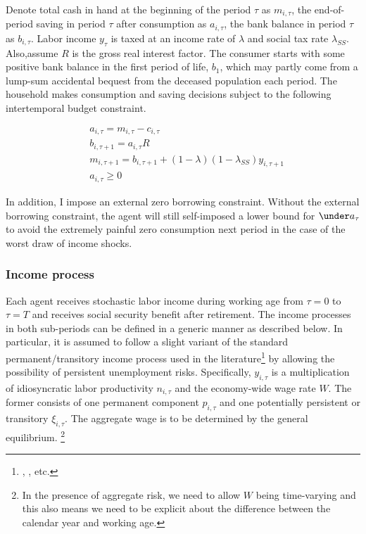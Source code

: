  Denote total cash in hand at the beginning of the period
\(\tau\) as $m_{i,\tau}$, the end-of-period saving in period $\tau$ after consumption as $a_{i,\tau}$, the bank balance in period $\tau$ as $b_{i,\tau}$. Labor income $y_\tau$ is taxed at an income rate of $\lambda$ and social tax rate $\lambda_{SS}$. Also,assume 
$R$ is the gross real interest factor. The consumer starts with some positive bank balance in the first period of life,  $b_1$, which may partly come from a lump-sum accidental bequest from the deceased population each period. The household makes consumption and saving decisions subject to the following intertemporal budget constraint.

\begin{equation}
\begin{split}
& a_{i,\tau} = m_{i,\tau} - c_{i,\tau} \\
& b_{i,\tau+1} = a_{i,\tau} R  \\
& m_{i,\tau+1}   = b_{i,\tau+1}+(1-\lambda)(1-\lambda_{SS})y_{i,\tau+1}\\
& a_{i,\tau} \geq 0 
\end{split}
\end{equation}

In addition, I impose an external zero borrowing constraint.  Without the external borrowing constraint, the agent will still self-imposed a lower bound for $\under a_\tau$ to avoid the extremely painful zero consumption next period in the case of the worst draw of income shocks. 



\subsubsection{Income process}

Each agent receives stochastic labor income during working age from $\tau=0$ to $\tau=T$ and receives social security benefit after retirement. The income processes in both sub-periods can be defined in a generic manner as described below. In particular, it is assumed to follow a slight variant of the standard permanent/transitory income process used in the literature\footnote{\cite{carroll2017distribution}, \cite{kaplan2018microeconomic}, etc.} by allowing the possibility of persistent unemployment risks. Specifically, $y_{i,\tau}$ is a multiplication of idiosyncratic labor productivity $n_{i,\tau}$ and the economy-wide wage rate $W$. The former consists of one permanent component $p_{i,\tau}$ and one potentially persistent or transitory $\xi_{i,\tau}$. The aggregate wage is to be determined by the general equilibrium. \footnote{In the presence of aggregate risk, we need to allow $W$ being time-varying and this also means we need to be explicit about the difference between the calendar year and working age.} 

